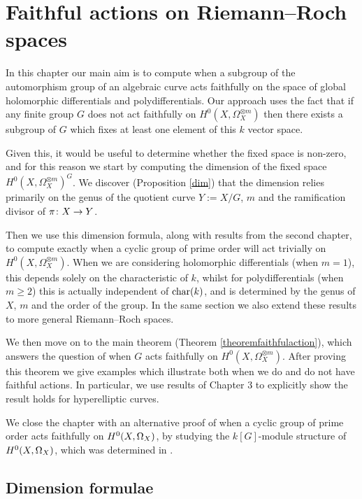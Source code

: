 \chapter{Faithful actions on Riemann--Roch spaces} \label{Chapter:Faithfulactions}

In this chapter our main aim is to compute when a subgroup of the automorphism group of an algebraic curve acts faithfully on the space of global holomorphic differentials and polydifferentials.
Our approach uses the fact that if any finite group $G$ does not act faithfully on $H^0(X,\Omega_X^{\otimes m})$ then there exists a subgroup of $G$ which fixes at least one element of this $k$ vector space.

Given this, it would be useful to determine whether the fixed space is non-zero, and for this reason we start by computing the dimension of the fixed space $H^0(X,\Omega_X^{\otimes m})^G$.
We discover (Proposition \ref{dim}) that the dimension relies primarily on the genus of the quotient curve $Y:=X/G$, $m$ and the ramification divisor of $\pi \colon X \rightarrow Y$.

Then we use this dimension formula, along with results from the second chapter, to compute exactly when a cyclic group of prime order will act trivially on $H^0(X,\Omega_X^{\otimes m})$.
When we are considering holomorphic differentials (\ie when $m=1$), this depends solely on the characteristic of $k$, whilst for polydifferentials (\ie when $m \geq 2$) this is actually independent of $\operatorname{char} (k)$, and is determined by the genus of $X$, $m$ and the order of the group.
In the same section we also extend these results to more general Riemann--Roch spaces.

We then move on to the main theorem (Theorem \ref{theoremfaithfulaction}), which answers the question of when $G$ acts faithfully on $H^0(X,\Omega_X^{\otimes m})$.
After proving this theorem we give examples which illustrate both when we do and do not have faithful actions.
In particular, we use results of Chapter 3 to explicitly show the result holds for hyperelliptic curves.

We close the chapter with an alternative proof of when a cyclic group of prime order acts faithfully on ${H^0(X,\Omega_X)}$, by studying the $k[G]$-module structure of ${H^0(X,\Omega_X)}$, which was determined in \cite{valmadan}.

\section{Dimension formulae}\label{dimsection}

